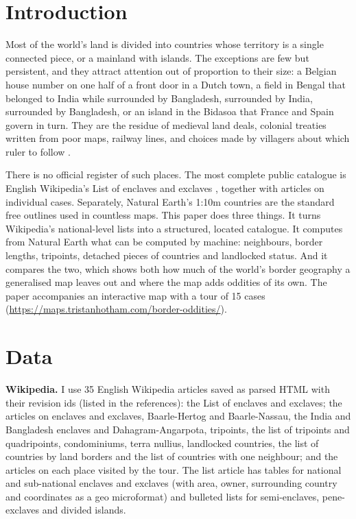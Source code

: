 \documentclass[11pt,a4paper]{article}
\begin{document}
\section{Introduction}
Most of the world's land is divided into countries whose territory is a single connected piece, or a mainland with islands. The exceptions are few but persistent, and they attract attention out of proportion to their size: a Belgian house number on one half of a front door in a Dutch town, a field in Bengal that belonged to India while surrounded by Bangladesh, surrounded by India, surrounded by Bangladesh, or an island in the Bidasoa that France and Spain govern in turn. They are the residue of medieval land deals, colonial treaties written from poor maps, railway lines, and choices made by villagers about which ruler to follow \citep{wlist,wenclave}.

There is no official register of such places. The most complete public catalogue is English Wikipedia's List of enclaves and exclaves \citep{wlist}, together with articles on individual cases. Separately, Natural Earth's 1:10m countries \citep{naturalearth} are the standard free outlines used in countless maps. This paper does three things. It turns Wikipedia's national-level lists into a structured, located catalogue. It computes from Natural Earth what can be computed by machine: neighbours, border lengths, tripoints, detached pieces of countries and landlocked status. And it compares the two, which shows both how much of the world's border geography a generalised map leaves out and where the map adds oddities of its own. The paper accompanies an interactive map with a tour of 15 cases (\url{https://maps.tristanhotham.com/border-oddities/}).

\section{Data}
\textbf{Wikipedia.} I use 35 English Wikipedia articles saved as parsed HTML with their revision ids (listed in the references): the List of enclaves and exclaves; the articles on enclaves and exclaves, Baarle-Hertog and Baarle-Nassau, the India and Bangladesh enclaves and Dahagram-Angarpota, tripoints, the list of tripoints and quadripoints, condominiums, terra nullius, landlocked countries, the list of countries by land borders and the list of countries with one neighbour; and the articles on each place visited by the tour. The list article has tables for national and sub-national enclaves and exclaves (with area, owner, surrounding country and coordinates as a geo microformat) and bulleted lists for semi-enclaves, pene-exclaves and divided islands.
\end{document}
